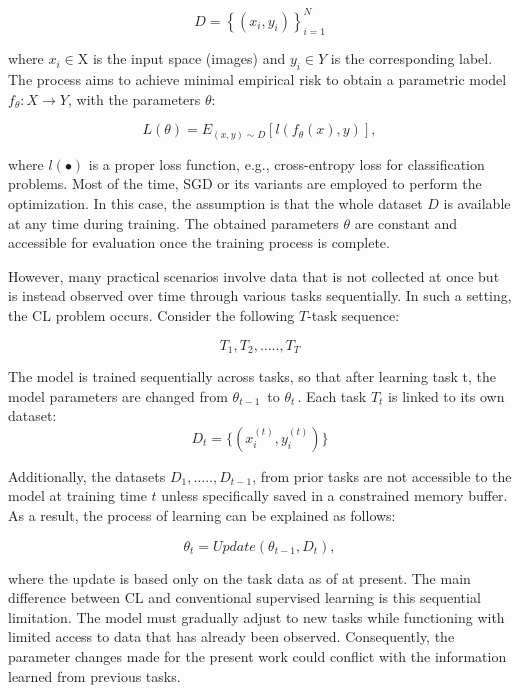 \documentclass[english, LaM, oneside]{sapthesis}%
\numberwithin{equation}{chapter}
\begin{document}
\begin{equation}
    D=\left\{\left(x_i,y_i\right)\right\}_{i=1}^N
\end{equation}


where $x_i\in\mathrm{X}$ is the input space (images) and $y_i\in Y$ is the corresponding label. The process aims to achieve minimal empirical risk to obtain a parametric model $f_\theta:X\rightarrow Y$, with the parameters $\theta$:

\begin{equation}
    L\left(\theta\right)=E_{(x,y)\sim D}\left[l(f_\theta\left(x\right),y)\right],
\end{equation}


where $l(\bullet)$ is a proper loss function, e.g., cross-entropy loss for classification problems. Most of the time, SGD or its variants are employed to perform the optimization\cite{16}.
In this case, the assumption is that the whole dataset $D$ is available at any time during training. The obtained parameters $\theta$ are constant and accessible for evaluation once the training process is complete.

However, many practical scenarios involve data that is not collected at once but is instead observed over time through various tasks sequentially. In such a setting, the CL problem occurs.
Consider the following $T$-task sequence:

\begin{equation}
    T_1,T_2,\ldots..,T_T
\end{equation}

The model is trained sequentially across tasks, so that after learning task t, the model parameters are changed from $\theta_{t-1\ }$ to $\theta_{t\ }$. 
Each task $T_t$ is linked to its own dataset:
\begin{equation}
    D_t=\{{(x_i^{\left(t\right)},y_i^{\left(t\right)})}\}
\end{equation}

Additionally, the datasets $D_1,\ldots..,D_{t-1}$, from prior tasks are not accessible to the model at training time $t$ unless specifically saved in a constrained memory buffer. As a result, the process of learning can be explained as follows:

\begin{equation}
    \theta_t=Update\left(\theta_{t-1},D_t\right),
\end{equation}

where the update is based only on the task data as of at present.
The main difference between CL and conventional supervised learning is this sequential limitation. The model must gradually adjust to new tasks while functioning with limited access to data that has already been observed. Consequently, the parameter changes made for the present work could conflict with the information learned from previous tasks.
\end{document}
